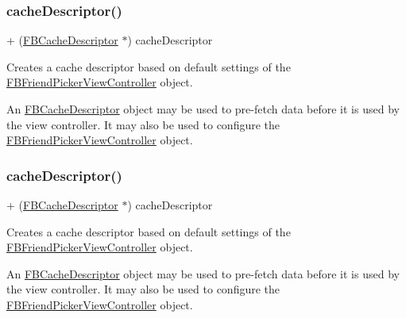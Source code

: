 \subsubsection{\texorpdfstring{cache\+Descriptor()}{cacheDescriptor()}\hspace{0.1cm}{\footnotesize\ttfamily [4/5]}}
{\footnotesize\ttfamily + (\hyperlink{interfaceFBCacheDescriptor}{F\+B\+Cache\+Descriptor} $\ast$) cache\+Descriptor \begin{DoxyParamCaption}{ }\end{DoxyParamCaption}}

Creates a cache descriptor based on default settings of the {\ttfamily \hyperlink{interfaceFBFriendPickerViewController}{F\+B\+Friend\+Picker\+View\+Controller}} object.

An {\ttfamily \hyperlink{interfaceFBCacheDescriptor}{F\+B\+Cache\+Descriptor}} object may be used to pre-\/fetch data before it is used by the view controller. It may also be used to configure the {\ttfamily \hyperlink{interfaceFBFriendPickerViewController}{F\+B\+Friend\+Picker\+View\+Controller}} object. \mbox{\label{interfaceFBFriendPickerViewController_afdb5497a310ae6cdc8ede333659a33dd}} 
\subsubsection{\texorpdfstring{cache\+Descriptor()}{cacheDescriptor()}\hspace{0.1cm}{\footnotesize\ttfamily [5/5]}}
{\footnotesize\ttfamily + (\hyperlink{interfaceFBCacheDescriptor}{F\+B\+Cache\+Descriptor} $\ast$) cache\+Descriptor \begin{DoxyParamCaption}{ }\end{DoxyParamCaption}}

Creates a cache descriptor based on default settings of the {\ttfamily \hyperlink{interfaceFBFriendPickerViewController}{F\+B\+Friend\+Picker\+View\+Controller}} object.

An {\ttfamily \hyperlink{interfaceFBCacheDescriptor}{F\+B\+Cache\+Descriptor}} object may be used to pre-\/fetch data before it is used by the view controller. It may also be used to configure the {\ttfamily \hyperlink{interfaceFBFriendPickerViewController}{F\+B\+Friend\+Picker\+View\+Controller}} object. \mbox{\label{interfaceFBFriendPickerViewController_a64d705a35ce97ceb5ef7eb7b54a8f503}} 
